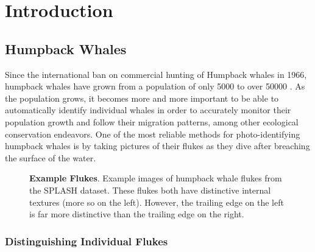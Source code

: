 
\chapter{Introduction} \label{sec:introduction}
 
\section{Humpback Whales}

Since the international ban on commercial hunting of Humpback whales in 1966, humpback whales have grown from a population of only 5000 \cite{baker1993abundant} to over 50000 \cite{branch2011humpback}. 
As the population grows, it becomes more and more important to be able to automatically identify individual whales in order to accurately monitor their population growth and follow their migration patterns, among other ecological conservation endeavors.
One of the most reliable methods for photo-identifying humpback whales is by taking pictures of their flukes as they dive after breaching the surface of the water.

\begin{figure}[t]%
\centering
{}
\newline
{}
\caption{\textbf{Example Flukes}. Example images of humpback whale flukes from the SPLASH \cite{calambokidis2008splash} dataset. These flukes both have distinctive internal textures (more so on the left). However, the trailing edge on the left is far more distinctive than the trailing edge on the right.}
\label{fig:example_fluke}
\end{figure}

\subsection{Distinguishing Individual Flukes}

